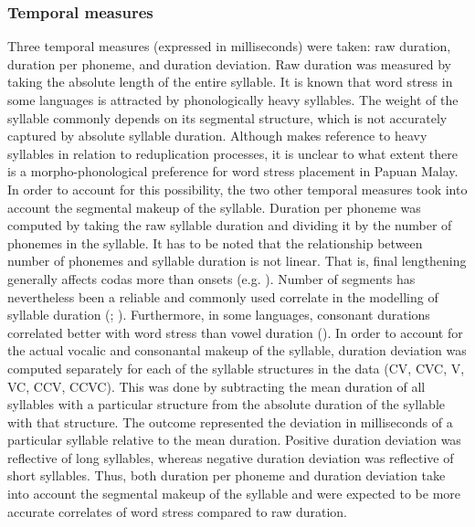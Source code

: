 \subsubsection{Temporal measures}
Three temporal measures (expressed in milliseconds) were taken: raw duration, duration per phoneme, and duration deviation. Raw duration was measured by taking the absolute length of the entire syllable. It is known that word stress in some languages is attracted by phonologically heavy syllables. The weight of the syllable commonly depends on its segmental structure, which is not accurately captured by absolute syllable duration. Although \citet[ch.4]{kluge_grammar_2017} makes reference to heavy syllables in relation to reduplication processes, it is unclear to what extent there is a morpho-phonological preference for word stress placement in Papuan Malay. In order to account for this possibility, the two other temporal measures took into account the segmental makeup of the syllable. Duration per phoneme was computed by taking the raw syllable duration and dividing it by the number of phonemes in the syllable. It has to be noted that the relationship between number of phonemes and syllable duration is not linear. That is, final lengthening generally affects codas more than onsets (e.g. \citealt{campbell_segment_1991}). Number of segments has nevertheless been a reliable and commonly used correlate in the modelling of syllable duration (\citealt{campbell_segment_1991}; \citealt{fletcher_segment_1993}). Furthermore, in some languages, consonant durations correlated better with word stress than vowel duration (\citealt{gordon_acoustic_2017}). In order to account for the actual vocalic and consonantal makeup of the syllable, duration deviation was computed separately for each of the syllable structures in the data (CV, CVC, V, VC, CCV, CCVC). This was done by subtracting the mean duration of all syllables with a particular structure from the absolute duration of the syllable with that structure. The outcome represented the deviation in milliseconds of a particular syllable relative to the mean duration. Positive duration deviation was reflective of long syllables, whereas negative duration deviation was reflective of short syllables. Thus, both duration per phoneme and duration deviation take into account the segmental makeup of the syllable and were expected to be more accurate correlates of word stress compared to raw duration.

